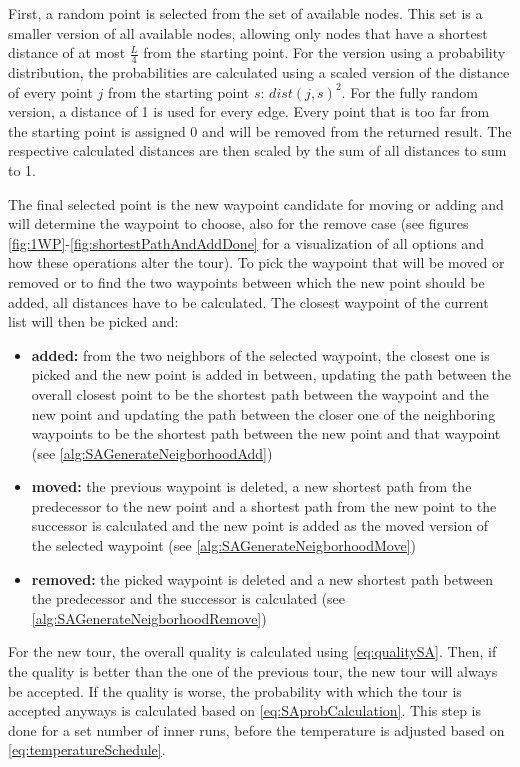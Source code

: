 First, a random point is selected from the set of available nodes.
This set is a smaller version of all available nodes, allowing only nodes that have a shortest distance of at most $\frac{L}{4}$ from the starting point. 
For the version using a probability distribution, the probabilities are calculated using a scaled version of the distance of every point $j$ from the starting point $s$: $dist(j,s)^2$.
For the fully random version, a distance of 1 is used for every edge.
Every point that is too far from the starting point is assigned 0 and will be removed from the returned result.
The respective calculated distances are then scaled by the sum of all distances to sum to 1.

The final selected point is the new waypoint candidate for moving or adding and will determine the waypoint to choose, also for the remove case (see figures \ref{fig:1WP}-\ref{fig:shortestPathAndAddDone} for a visualization of all options and how these operations alter the tour).
To pick the waypoint that will be moved or removed or to find the two waypoints between which the new point should be added, all distances have to be calculated.
The closest waypoint of the current list will then be picked and:

\begin{itemize}
	\item \textbf{added:} from the two neighbors of the selected waypoint, the closest one is picked and the new point is added in between, updating the path between the overall closest point to be the shortest path between the waypoint and the new point and updating the path between the closer one of the neighboring waypoints to be the shortest path between the new point and that waypoint (see \ref{alg:SAGenerateNeigborhoodAdd})
	\item \textbf{moved:} the previous waypoint is deleted, a new shortest path from the predecessor to the new point and a shortest path from the new point to the successor is calculated and the new point is added as the moved version of the selected waypoint (see \ref{alg:SAGenerateNeigborhoodMove})
	\item \textbf{removed:} the picked waypoint is deleted and a new shortest path between the predecessor and the successor is calculated (see \ref{alg:SAGenerateNeigborhoodRemove})
\end{itemize}

For the new tour, the overall quality is calculated using \ref{eq:qualitySA}. 
Then, if the quality is better than the one of the previous tour, the new tour will always be accepted.
If the quality is worse, the probability with which the tour is accepted anyways is calculated based on \ref{eq:SAprobCalculation}. 
This step is done for a set number of inner runs, before the temperature is adjusted based on \ref{eq:temperatureSchedule}.

